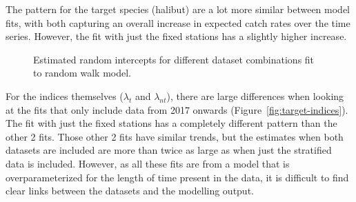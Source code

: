 \documentclass[12pt]{article}\usepackage[]{graphicx}\usepackage[]{color}
\begin{document}
The pattern for the target species (halibut) are a lot more similar between model fits, with both capturing an overall increase in expected catch rates over the time series. However, the fit with just the fixed stations has a slightly higher increase.
\begin{figure}[htb]

{\centering {}  

}

\caption{Estimated random intercepts for different dataset combinations fit to random walk model.}\label{fig:rand-int}
\end{figure}
For the indices themselves (\(\lambda_t\) and \(\lambda_{nt}\)), there are large differences when looking at the fits that only include data from 2017 onwards (Figure~\ref{fig:target-indices}). The fit with just the fixed stations has a completely different pattern than the other 2 fits. Those other 2 fits have similar trends, but the estimates when both datasets are included are more than twice as large as when just the stratified data is included. However, as all these fits are from a model that is overparameterized for the length of time present in the data, it is difficult to find clear links between the datasets and the modelling output.
\end{document}
